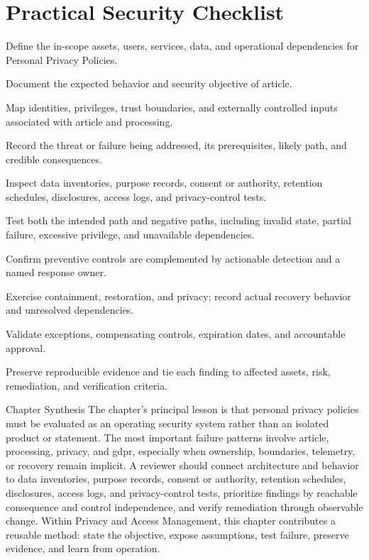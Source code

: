 \documentclass[11pt,letterpaper]{article}
\begin{document}
\section*{Practical Security Checklist}
\begin{CornellChecklist}
\item Define the in-scope assets, users, services, data, and operational dependencies for Personal Privacy Policies.
\item Document the expected behavior and security objective of article.
\item Map identities, privileges, trust boundaries, and externally controlled inputs associated with article and processing.
\item Record the threat or failure being addressed, its prerequisites, likely path, and credible consequences.
\item Inspect data inventories, purpose records, consent or authority, retention schedules, disclosures, access logs, and privacy-control tests.
\item Test both the intended path and negative paths, including invalid state, partial failure, excessive privilege, and unavailable dependencies.
\item Confirm preventive controls are complemented by actionable detection and a named response owner.
\item Exercise containment, restoration, and privacy; record actual recovery behavior and unresolved dependencies.
\item Validate exceptions, compensating controls, expiration dates, and accountable approval.
\item Preserve reproducible evidence and tie each finding to affected assets, risk, remediation, and verification criteria.
\end{CornellChecklist}
\begin{CornellSummaryBox}{Chapter Synthesis}
The chapter's principal lesson is that personal privacy policies must be evaluated as an operating security system rather than an isolated product or statement. The most important failure patterns involve article, processing, privacy, and gdpr, especially when ownership, boundaries, telemetry, or recovery remain implicit. A reviewer should connect architecture and behavior to data inventories, purpose records, consent or authority, retention schedules, disclosures, access logs, and privacy-control tests, prioritize findings by reachable consequence and control independence, and verify remediation through observable change. Within Privacy and Access Management, this chapter contributes a reusable method: state the objective, expose assumptions, test failure, preserve evidence, and learn from operation.
\end{CornellSummaryBox}
\end{document}
